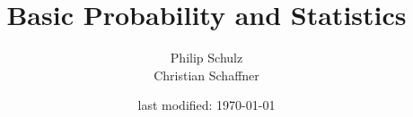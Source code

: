\documentclass[11pt,leqno,a4paper]{report}
\author{Philip Schulz \\ Christian Schaffner}
\title{Basic Probability and Statistics}
\date{last modified: \today}
\begin{document}
\begin{titlepage}
\maketitle
\end{titlepage}

\tableofcontents
\graphicspath{{../chapter3/}}

\newpage





\end{document}
